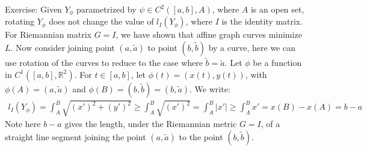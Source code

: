 \documentclass[15pt]{book}
\theoremstyle{break}
\theoremstyle{break}
\newcommand{\R}{\mathbb{R}}
\newcommand{\that}[1]{\widetilde{#1}}
\newcommand{\exercise}{\color{green}Exercise: \color{black}}
\begin{document}
\exercise Given $Y_{\phi}$ parametrized by $\psi\in C^2([a,b],A)$, where $A$ is an open set, rotating $Y_{\phi}$ does not change the value of $l_I(Y_{\phi})$, where $I$ is the identity matrix.\\ 

For Riemannian matrix $G = I$, we have shown that affine graph curves minimize $L$. Now consider joining point $(a,\that{a})$ to point $(b,\that{b})$ by a curve, here we can use rotation of the curves to reduce to the case where $\that{b} = \that{a}$. Let $\phi$ be a function in $C^1([a,b],\R^2)$. For $t\in [a,b]$, let $\phi(t) = (x(t), y(t))$, with $\phi(A) = (a,\that{a})$ and $\phi(B) =(b,\that{b}) = (b,\that{a})$. We write:
\begin{align*}
l_I(Y_{\phi}) = \int_A^B \sqrt{(x')^2 + (y')^2} \geq \int_A^B \sqrt{(x')^2} = \int_A^B |x'| \geq \int_A^B x' = x(B) - x(A) = b-a
\end{align*}
Note here $b-a$ gives the length, under the Riemannian metric $G = I$, of a straight line segment joining the point $(a,\that{a})$ to the point $(b,\that{b})$.\\
\end{document}
